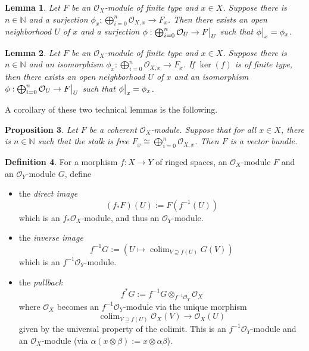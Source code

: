 \documentclass{scrartcl}
\newcommand{\N}{\mathbb{N}}
\renewcommand{\O}{\mathcal{O}}
\DeclareMathOperator*{\colim}{colim}
\newcommand\restr[2]{{
    \left.\kern-\nulldelimiterspace
    #1
    \vphantom{\big|}
    \right|_{#2}
}}
\newtheorem{prop}{Proposition}[section]
\newtheorem{lemma}[prop]{Lemma}
\theoremstyle{definition}
\newtheorem{definition}[prop]{Definition}
\begin{document}
\begin{lemma}
    Let $F$ be an $\O_X$-module of finite type and $x \in X$.
    Suppose there is $n \in \N$ and a surjection $\phi_x: \bigoplus_{i = 0}^n \O_{X, x} \to F_x$.
    Then there exists an open neighborhood $U$ of $x$ and a surjection $\phi: \bigoplus_{i = 0}^n \O_U \to \restr{F}{U}$ such that $\restr{\phi}{x} = \phi_x$.
\end{lemma}
\begin{lemma}
    Let $F$ be an $\O_X$-module of finite type and $x \in X$.
    Suppose there is $n \in \N$ and an isomorphism $\phi_x: \bigoplus_{i = 0}^n \O_{X, x} \to F_x$.
    If $\ker(f)$ is of finite type, then there exists an open neighborhood $U$ of $x$ and an isomorphism $\phi: \bigoplus_{i = 0}^n \O_U \to \restr{F}{U}$ such that $\restr{\phi}{x} = \phi_x$.
\end{lemma}
A corollary of these two technical lemmas is the following.
\begin{prop}
    Let $F$ be a coherent $\O_X$-module.
    Suppose that for all $x \in X$, there is $n \in \N$ such that the stalk is free $F_x \cong \bigoplus_{i = 0}^n \O_{X, x}$.
    Then $F$ is a vector bundle.
\end{prop}
\begin{definition}
    For a morphism $f: X \to Y$ of ringed spaces, an $\O_X$-module $F$ and an $\O_Y$-module $G$, define
    \begin{itemize}
        \item the \emph{direct image}
        \begin{equation*}
            (f_*F)(U) := F(f^{-1}(U))
        \end{equation*}
        which is an $f_*\O_X$-module, and thus an $\O_Y$-module.
        \item the \emph{inverse image}
        \begin{equation*}
            f^{-1}G := \left( U \mapsto \colim_{V \supseteq f(U)} G(V) \right)
        \end{equation*}
        which is an $f^{-1}\O_Y$-module.
        \item the \emph{pullback}
        \begin{equation*}
            f^*G := f^{-1}G \otimes_{f^{-1}\O_Y} \O_X
        \end{equation*}
        where $\O_X$ becomes an $f^{-1}\O_Y$-module via the unique morphism
        \begin{equation*}
            \colim_{V \supseteq f(U)} \O_X(V) \to \O_X(U)
        \end{equation*}
        given by the universal property of the colimit.
        This is an $f^{-1}\O_Y$-module and an $\O_X$-module (via $\alpha(x \otimes \beta) := x \otimes \alpha \beta$).
    \end{itemize}
\end{definition}
\end{document}
